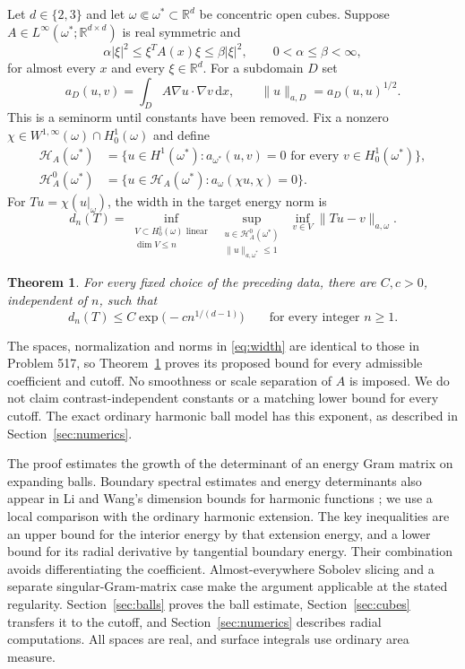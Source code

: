 \documentclass[11pt]{article}
\newtheorem{theorem}{Theorem}[section]
\theoremstyle{remark}
\newcommand{\R}{\mathbb R}
\newcommand{\Ha}{\mathcal H_A}
\newcommand{\norma}[2]{\|#1\|_{a,#2}}
\newcommand{\dd}{\,\mathrm d}
\begin{document}
Let $d\in\{2,3\}$ and let
$\omega\Subset\omega^*\subset\R^d$ be concentric open cubes. Suppose
$A\in L^\infty(\omega^*;\R^{d\times d})$ is real symmetric and
\begin{equation}\label{eq:ellipticity}
 \alpha |\xi|^2\le \xi^T A(x)\xi\le\beta|\xi|^2,
 \qquad 0<\alpha\le\beta<\infty,
\end{equation}
for almost every $x$ and every $\xi\in\R^d$. For a subdomain $D$ set
\[
 a_D(u,v)=\int_D A\nabla u\cdot\nabla v\dd x,\qquad
 \norma{u}{D}=a_D(u,u)^{1/2}.
\]
This is a seminorm until constants have been removed. Fix a nonzero
$\chi\in W^{1,\infty}(\omega)\cap H^1_0(\omega)$ and define
\begin{align*}
 \Ha(\omega^*)&=\{u\in H^1(\omega^*):
 a_{\omega^*}(u,v)=0\text{ for every }v\in H^1_0(\omega^*)\},\\
 \Ha^0(\omega^*)&=\{u\in\Ha(\omega^*):a_\omega(\chi u,\chi)=0\}.
\end{align*}
For $Tu=\chi(u|_\omega)$, the width in the target energy norm is
\begin{equation}\label{eq:width}
 d_n(T)=\inf_{\substack{V\subset H^1_0(\omega)\text{ linear}\\\dim V\le n}}
 \ \sup_{\substack{u\in\Ha^0(\omega^*)\\\norma{u}{\omega^*}\le1}}
 \ \inf_{v\in V}\norma{Tu-v}{\omega}.
\end{equation}

\begin{theorem}\label{thm:main}
For every fixed choice of the preceding data, there are $C,c>0$, independent
of $n$, such that
\[
 d_n(T)\le C\exp\bigl(-c n^{1/(d-1)}\bigr)
 \qquad\text{for every integer }n\ge1.
\]
\end{theorem}
The spaces, normalization and norms in \eqref{eq:width} are identical to
those in Problem 517, so Theorem~\ref{thm:main} proves its proposed bound
for every admissible coefficient and cutoff. No smoothness or scale separation
of $A$ is imposed. We do not claim contrast-independent constants or a
matching lower bound for every cutoff. The exact ordinary harmonic ball
model has this exponent, as described in Section~\ref{sec:numerics}.

The proof estimates the growth of the determinant of an energy Gram matrix
on expanding balls. Boundary spectral estimates and energy determinants
also appear in Li and Wang's dimension bounds for harmonic functions
\cite[Lemma 1 and Section 2]{LiWang2000}; we use a local comparison with
the ordinary harmonic extension. The key inequalities are an upper bound
for the interior energy by that extension energy, and a lower bound for
its radial derivative by tangential boundary energy. Their combination
avoids differentiating the coefficient. Almost-everywhere Sobolev slicing
and a separate singular-Gram-matrix case make the argument applicable at
the stated regularity. Section~\ref{sec:balls} proves the ball estimate,
Section~\ref{sec:cubes} transfers it to the cutoff, and
Section~\ref{sec:numerics} describes radial computations. All spaces are
real, and surface integrals use ordinary area measure.
\end{document}
